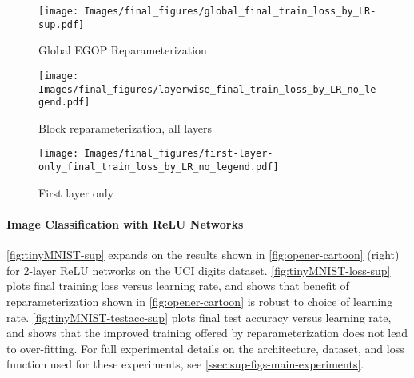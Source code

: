 \begin{figure*}
    \centering
    \begin{subfigure}[t]{0.32\textwidth}
        \centering
        \texttt{[image: Images/final\_figures/global\_final\_train\_loss\_by\_LR-sup.pdf]}
        \caption{Global EGOP Reparameterization}
        \label{fig:global-sup}
    \end{subfigure}
    \begin{subfigure}[t]{0.32\textwidth}
        \centering
        \texttt{[image: Images/final\_figures/layerwise\_final\_train\_loss\_by\_LR\_no\_legend.pdf]}
        \caption{Block reparameterization, all layers}
        \label{fig:block-sup}
    \end{subfigure}
    \begin{subfigure}[t]{0.32\textwidth}
        \centering
        \texttt{[image: Images/final\_figures/first-layer-only\_final\_train\_loss\_by\_LR\_no\_legend.pdf]}
        \caption{First layer only}
        \label{fig:first-layer-only-sup}
    \end{subfigure}
    \caption{Comparing three  EGOP reparameterization methods for training a multilayer linear network (\ref{eq:linear-feedforward-objective}). \cref{fig:global-sup} is a reproduction of \cref{fig:linear-layers-global-reparam-loss-vs-LR} in the main body, and shows results for performing EGOP reparameterization of all parameters simultaneously. \cref{fig:block-sup} shows results when performing block EGOP reparameterization, where each network layer forms a block. \cref{fig:first-layer-only-sup} shows results when block-reparameterizing only the parameters in the first layer.}
    \label{fig:sup-linear-networks}
\end{figure*}

\paragraph{Image Classification with ReLU Networks} \cref{fig:tinyMNIST-sup} expands on the results shown in \cref{fig:opener-cartoon}  (right) for 2-layer ReLU networks on the UCI digits dataset. \cref{fig:tinyMNIST-loss-sup} plots final training loss versus learning rate, and shows that benefit of reparameterization shown in \cref{fig:opener-cartoon} is robust to choice of learning rate. \cref{fig:tinyMNIST-testacc-sup} plots final test accuracy versus learning rate, and shows that the improved training offered by reparameterization does not lead to over-fitting. For full experimental details on the architecture, dataset, and loss function used for these experiments, see \cref{ssec:sup-figs-main-experiments}.

